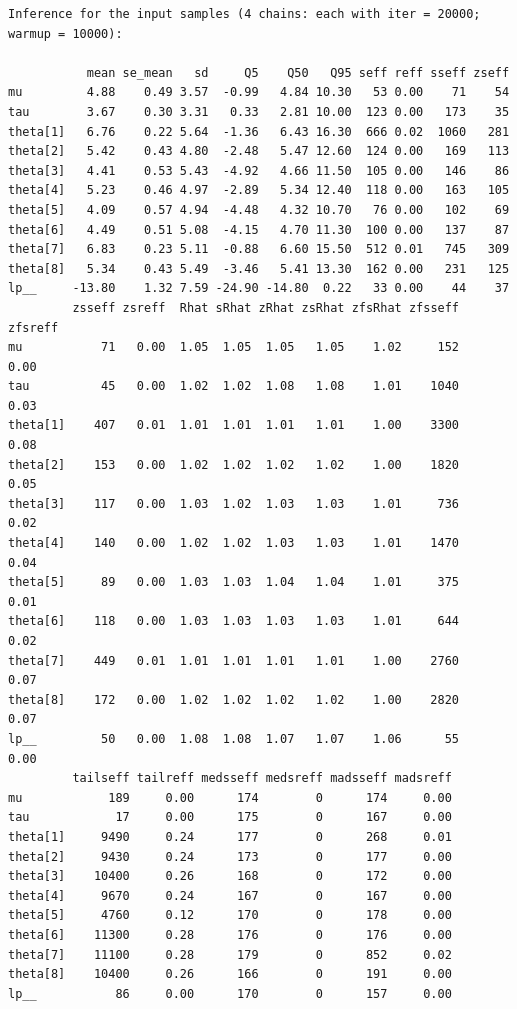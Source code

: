 \documentclass[american,]{article}
\begin{document}
\begin{verbatim}
Inference for the input samples (4 chains: each with iter = 20000; warmup = 10000):

           mean se_mean   sd     Q5    Q50   Q95 seff reff sseff zseff
mu         4.88    0.49 3.57  -0.99   4.84 10.30   53 0.00    71    54
tau        3.67    0.30 3.31   0.33   2.81 10.00  123 0.00   173    35
theta[1]   6.76    0.22 5.64  -1.36   6.43 16.30  666 0.02  1060   281
theta[2]   5.42    0.43 4.80  -2.48   5.47 12.60  124 0.00   169   113
theta[3]   4.41    0.53 5.43  -4.92   4.66 11.50  105 0.00   146    86
theta[4]   5.23    0.46 4.97  -2.89   5.34 12.40  118 0.00   163   105
theta[5]   4.09    0.57 4.94  -4.48   4.32 10.70   76 0.00   102    69
theta[6]   4.49    0.51 5.08  -4.15   4.70 11.30  100 0.00   137    87
theta[7]   6.83    0.23 5.11  -0.88   6.60 15.50  512 0.01   745   309
theta[8]   5.34    0.43 5.49  -3.46   5.41 13.30  162 0.00   231   125
lp__     -13.80    1.32 7.59 -24.90 -14.80  0.22   33 0.00    44    37
         zsseff zsreff  Rhat sRhat zRhat zsRhat zfsRhat zfsseff zfsreff
mu           71   0.00  1.05  1.05  1.05   1.05    1.02     152    0.00
tau          45   0.00  1.02  1.02  1.08   1.08    1.01    1040    0.03
theta[1]    407   0.01  1.01  1.01  1.01   1.01    1.00    3300    0.08
theta[2]    153   0.00  1.02  1.02  1.02   1.02    1.00    1820    0.05
theta[3]    117   0.00  1.03  1.02  1.03   1.03    1.01     736    0.02
theta[4]    140   0.00  1.02  1.02  1.03   1.03    1.01    1470    0.04
theta[5]     89   0.00  1.03  1.03  1.04   1.04    1.01     375    0.01
theta[6]    118   0.00  1.03  1.03  1.03   1.03    1.01     644    0.02
theta[7]    449   0.01  1.01  1.01  1.01   1.01    1.00    2760    0.07
theta[8]    172   0.00  1.02  1.02  1.02   1.02    1.00    2820    0.07
lp__         50   0.00  1.08  1.08  1.07   1.07    1.06      55    0.00
         tailseff tailreff medsseff medsreff madsseff madsreff
mu            189     0.00      174        0      174     0.00
tau            17     0.00      175        0      167     0.00
theta[1]     9490     0.24      177        0      268     0.01
theta[2]     9430     0.24      173        0      177     0.00
theta[3]    10400     0.26      168        0      172     0.00
theta[4]     9670     0.24      167        0      167     0.00
theta[5]     4760     0.12      170        0      178     0.00
theta[6]    11300     0.28      176        0      176     0.00
theta[7]    11100     0.28      179        0      852     0.02
theta[8]    10400     0.26      166        0      191     0.00
lp__           86     0.00      170        0      157     0.00
\end{verbatim}
\end{document}
